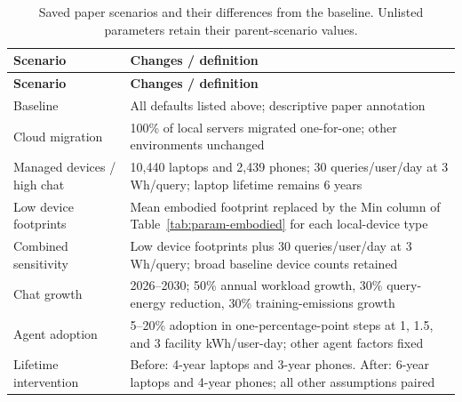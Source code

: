 {\begin{longtable}{|L{0.24\textwidth}|L{0.67\textwidth}|}
\caption{Saved paper scenarios and their differences from the baseline. Unlisted parameters retain their parent-scenario values.}\label{tab:param-scenarios}\\
\hline
\textbf{Scenario} & \textbf{Changes / definition} \\ \hline
\endfirsthead
\hline
\textbf{Scenario} & \textbf{Changes / definition} \\ \hline
\endhead
Baseline & All defaults listed above; descriptive paper annotation \\ \hline
Cloud migration & 100\% of local servers migrated one-for-one; other environments unchanged \\ \hline
Managed devices / high chat & 10,440 laptops and 2,439 phones; 30 queries/user/day at 3 Wh/query; laptop lifetime remains 6 years \\ \hline
Low device footprints & Mean embodied footprint replaced by the Min column of Table~\ref{tab:param-embodied} for each local-device type \\ \hline
Combined sensitivity & Low device footprints plus 30 queries/user/day at 3 Wh/query; broad baseline device counts retained \\ \hline
Chat growth & 2026--2030; 50\% annual workload growth, 30\% query-energy reduction, 30\% training-emissions growth \\ \hline
Agent adoption & 5--20\% adoption in one-percentage-point steps at 1, 1.5, and 3 facility kWh/user-day; other agent factors fixed \\ \hline
Lifetime intervention & Before: 4-year laptops and 3-year phones. After: 6-year laptops and 4-year phones; all other assumptions paired \\ \hline
\end{longtable}
}
